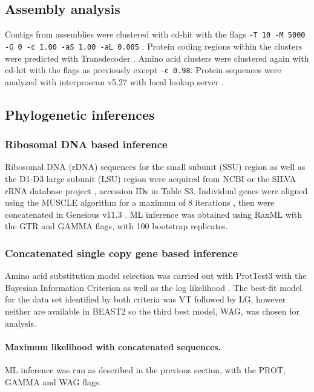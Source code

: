 \documentclass[fleqn,10pt,lineno]{wlpeerj} %
\begin{document}
\subsection*{Assembly analysis}
Contigs from assemblies were clustered with cd-hit with the flags \texttt{-T 10 -M 5000 -G 0 -c 1.00 -aS 1.00 -aL 0.005} \cite{fu2012cd}. 
Protein coding regions within the clusters were predicted with Transdecoder \cite{haas2016transdecoder}. 
Amino acid clusters were clustered again with cd-hit with the flags as previously except \texttt{-c 0.98}.
Protein sequences were analyzed with interproscan v5.27 with local lookup server \cite{quevillon2005interproscan}.

\subsection*{Phylogenetic inferences}
\subsubsection*{Ribosomal DNA based inference}
Ribosomal DNA (rDNA) sequences for the small subunit (SSU) region as well as the D1-D3 large subunit (LSU) region were acquired from NCBI \cite{coordinators2017database} or the SILVA rRNA database project \cite{silvaproj}, accession IDs in Table S3. 
Individual genes were aligned using the MUSCLE algorithm for a maximum of 8 iterations \cite{edgar2004muscle}, then were concatenated in Geneious v11.3 \cite{kearse2012geneious}.
ML inference was obtained using RaxML \cite{stamatakis2014raxml} with the GTR and GAMMA flags, with 100 bootstrap replicates.

\subsubsection*{Concatenated single copy gene based inference}
Amino acid substitution model selection was carried out with ProtTest3 with the Bayesian Information Criterion as well as the log likelihood \cite{darriba2011prottest,guindon2003simple}. 
The best-fit model for the data set identified by both criteria was VT followed by LG, however neither are available in BEAST2 so the third best model, WAG, was chosen for analysis. 
\paragraph*{Maximum likelihood with concatenated sequences.}
ML inference was run as described in the previous section, with the PROT, GAMMA and WAG flags.
\end{document}
